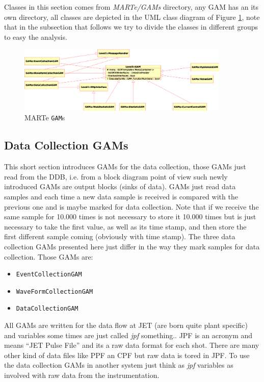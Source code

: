 Classes in this section comes from \textit{MARTe/GAMs} directory, any GAM has an its own directory, all classes are depicted in the UML class diagram of Figure \ref{f:MARTe:GAM}, note that in the subsection that follows we try to divide the classes in different groups to easy the analysis.

\begin{figure}[h!]
 \begin{center}
  \includegraphics[width=0.9\textwidth]{MARTe/GAMs.eps}
  \caption{MARTe \texttt{GAM}s}
  \label{f:MARTe:GAM}
 \end{center}
\end{figure}



\subsection{Data Collection GAMs}
This short section introduces GAMs for the data collection, those GAMs just read from the DDB, i.e. from a block diagram point of view such newly introduced GAMs are output blocks (sinks of data). GAMs just read data samples and each time a new data sample is received is compared with the previous one and is maybe marked for data collection. Note that if we receive the same sample for 10.000 times is not necessary to store it 10.000 times but is just necessary to take the first value, as well as its time stamp, and then store the first different sample coming (obviously with time stamp). The three data collection GAMs presented here just differ in the way they mark samples for data collection. Those GAMs are:
\begin{itemize}
 \item \texttt{EventCollectionGAM}
 \item \texttt{WaveFormCollectionGAM}
 \item \texttt{DataCollectionGAM}
\end{itemize}

All GAMs are written for the data flow at JET (are born quite plant specific) and variables some times are just called \textit{jpf} something.. JPF is an acronym and means ``JET Pulse File'' and its a raw data format for each shot. There are many other kind of data files like PPF an CPF but raw data is tored in JPF. To use the data collection GAMs in another system just think as \textit{jpf} variables as involved with raw data from the instrumentation. \\


